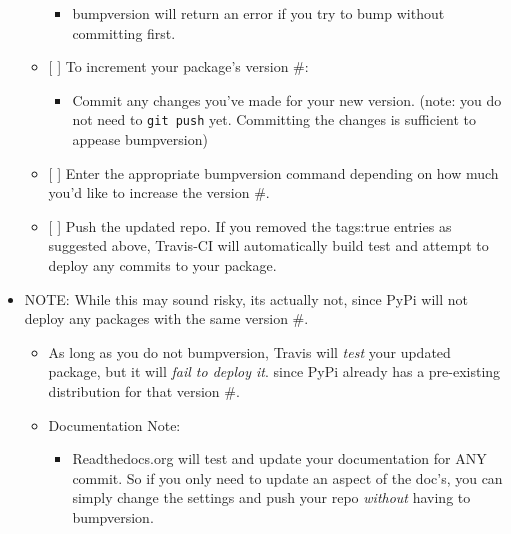 \documentclass[11pt]{article}
\providecommand{\tightlist}{%
      \setlength{\itemsep}{0pt}\setlength{\parskip}{0pt}}
\begin{document}
\begin{itemize}
\begin{itemize}
    \begin{itemize}
    \tightlist
    \item
      bumpversion will return an error if you try to bump without
      committing first.
    \end{itemize}
  \item
    {[} {]} To increment your package's version \#:

    \begin{itemize}
    \tightlist
    \item
      Commit any changes you've made for your new version. (note: you do
      not need to \texttt{git\ push} yet. Committing the changes is
      sufficient to appease bumpversion)
    \end{itemize}
  \item
    {[} {]} Enter the appropriate bumpversion command depending on how
    much you'd like to increase the version \#.
  \item
    {[} {]} Push the updated repo. If you removed the tags:true entries
    as suggested above, Travis-CI will automatically build test and
    attempt to deploy any commits to your package.
  \end{itemize}
\item
  NOTE: While this may sound risky, its actually not, since PyPi will
  not deploy any packages with the same version \#.

  \begin{itemize}
  \tightlist
  \item
    As long as you do not bumpversion, Travis will \emph{test} your
    updated package, but it will \emph{fail to deploy it}. since PyPi
    already has a pre-existing distribution for that version \#.
  \item
    Documentation Note:

    \begin{itemize}
    \tightlist
    \item
      Readthedocs.org will test and update your documentation for ANY
      commit. So if you only need to update an aspect of the doc's, you
      can simply change the settings and push your repo \emph{without}
      having to bumpversion.
    \end{itemize}
  \end{itemize}
\end{itemize}


    
    
    
    
\end{document}
